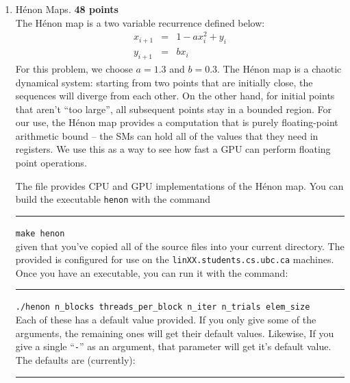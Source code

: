 \documentclass{article}
\newcommand{\Henon}{H\'{e}non}
\begin{document}
\begin{enumerate}
    \item \Henon{} Maps. \textbf{48 points}\label{q:recur}\\
          The \Henon{} map is a two variable recurrence defined below:
          \begin{equation}\label{eq:henon}\begin{array}{rcl}
                  x_{i+1} & = & 1 - a x_i^2 + y_i \\
                  y_{i+1} & = & b x_i
              \end{array}\end{equation}
          For this problem, we choose $a=1.3$ and $b=0.3$.
          The \Henon{} map is a chaotic dynamical system: starting from two points that are
          initially close, the sequences will diverge from each other.  On the other hand,
          for initial points that aren't ``too large'', all subsequent points stay in a bounded
          region.
          For our use, the \Henon{} map provides a computation that is purely floating-point
          arithmetic bound -- the SMs can hold all of the values that they need in registers.
          We use this as a way to see how fast a GPU can perform floating point operations.
          \par
          The file 
          provides CPU and GPU implementations of the \Henon{} map.
          You can build the executable \texttt{henon} with the command\\
          \rule{1.5em}{0ex}\texttt{make henon}\\
          given that you've copied all of the source files into your current directory.
          The provided
          is configured for use on the \texttt{linXX.students.cs.ubc.ca} machines.
          Once you have an executable, you can run it with the command:\\
          \rule{1.5em}{0ex}\texttt{./henon n\_blocks threads\_per\_block n\_iter n\_trials elem\_size}\\
          Each of these has a default value provided.  If you only give some of the arguments,
          the remaining ones will get their default values.
          Likewise, If you give a single ``\texttt{-}'' as an argument, that parameter will get it's
          default value.  The defaults are (currently):\\
          \rule{1.5em}{0ex}%
\end{enumerate}
\end{document}
